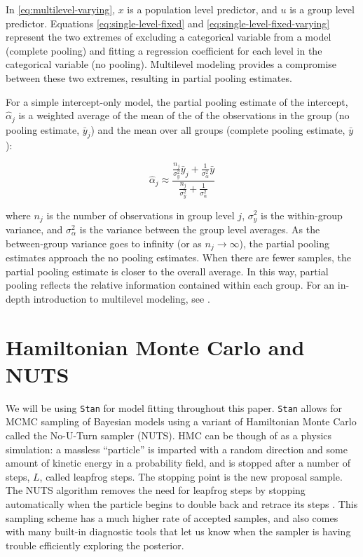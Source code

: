 \documentclass[11pt, oneside, openany]{scrbook}
\begin{document}
In \eqref{eq:multilevel-varying}, \(x\) is a population level predictor, and \(u\) is a group level predictor. Equations \eqref{eq:single-level-fixed} and \eqref{eq:single-level-fixed-varying} represent the two extremes of excluding a categorical variable from a model (complete pooling) and fitting a regression coefficient for each level in the categorical variable (no pooling). Multilevel modeling provides a compromise between these two extremes, resulting in partial pooling estimates.

For a simple intercept-only model, the partial pooling estimate of the intercept, \(\hat{\alpha}_j\) is a weighted average of the mean of the of the observations in the group (no pooling estimate, \(\bar{y}_j\)) and the mean over all groups (complete pooling estimate, \(\bar{y}\)):

\[
\hat{\alpha}_j \approx \frac{\frac{n_j}{\sigma_y^2} \bar{y}_j + \frac{1}{\sigma_\alpha^2} \bar{y}}{\frac{n_j}{\sigma_y^2} + \frac{1}{\sigma_\alpha^2}}
\]

where \(n_j\) is the number of observations in group level \(j\), \(\sigma_y^2\) is the within-group variance, and \(\sigma_\alpha^2\) is the variance between the group level averages. As the between-group variance goes to infinity (or as \(n_j \rightarrow \infty\)), the partial pooling estimates approach the no pooling estimates. When there are fewer samples, the partial pooling estimate is closer to the overall average. In this way, partial pooling reflects the relative information contained within each group. For an in-depth introduction to multilevel modeling, see \citet{gelman2006data}.

\hypertarget{hamiltonian-monte-carlo-and-nuts}{%
\section{Hamiltonian Monte Carlo and NUTS}\label{hamiltonian-monte-carlo-and-nuts}}

We will be using \texttt{Stan} for model fitting throughout this paper. \texttt{Stan} allows for MCMC sampling of Bayesian models using a variant of Hamiltonian Monte Carlo called the No-U-Turn sampler (NUTS). HMC can be though of as a physics simulation: a massless ``particle'' is imparted with a random direction and some amount of kinetic energy in a probability field, and is stopped after a number of steps, \(L\), called leapfrog steps. The stopping point is the new proposal sample. The NUTS algorithm removes the need for leapfrog steps by stopping automatically when the particle begins to double back and retrace its steps \citep{hoffman2014no}. This sampling scheme has a much higher rate of accepted samples, and also comes with many built-in diagnostic tools that let us know when the sampler is having trouble efficiently exploring the posterior.
\end{document}
